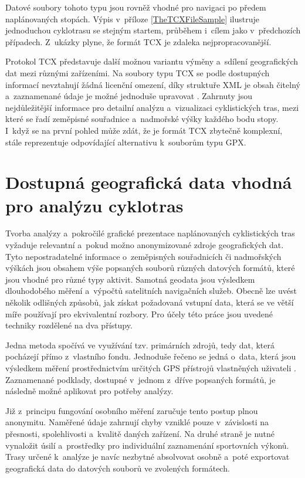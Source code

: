 Datové soubory tohoto typu jsou rovněž vhodné pro navigaci po předem naplánovaných stopách.
Výpis v~příloze \ref{TheTCXFileSample} ilustruje jednoduchou cyklotrasu se stejným startem, průběhem i~cílem jako v~předchozích případech.
Z~ukázky plyne, že formát TCX je zdaleka nejpropracovanější.

Protokol TCX představuje další možnou variantu výměny a~sdílení geografických dat mezi různými zařízeními.
Na soubory typu TCX se podle dostupných informací nevztahují žádná licenční omezení, díky struktuře XML je obsah čitelný a~zaznamenané údaje je možné jednoduše upravovat \cite{AnssensCharles2021}.
Zahrnuty jsou nejdůležitější informace pro detailní analýzu a~vizualizaci cyklistických tras, mezi které se řadí zeměpisné souřadnice a~nadmořské výšky každého bodu stopy.
I~když se na první pohled může zdát, že je formát TCX zbytečně komplexní, stále reprezentuje odpovídající alternativu k~souborům typu GPX.

\section{Dostupná geografická data vhodná pro analýzu cyklotras}
\label{available-geographic-data-suitable-for-cycle-routes-analysis}

Tvorba analýzy a~pokročilé grafické prezentace naplánovaných cyklistických tras vyžaduje relevantní a~pokud možno anonymizované zdroje geografických dat.
Tyto nepostradatelné informace o~zeměpisných souřadnicích či nadmořských výškách jsou obsahem výše popsaných souborů různých datových formátů, které jsou vhodné pro různé typy aktivit.
Samotná geodata jsou výsledkem dlouhodobého měření a~výpočtů satelitních navigačních služeb.
Obecně lze uvést několik odlišných způsobů, jak získat požadovaná vstupní data, která se ve větší míře používají pro ekvivalentní rozbory.
Pro účely této práce jsou uvedené techniky rozdělené na dva přístupy.

Jedna metoda spočívá ve využívání tzv. primárních zdrojů, tedy dat, která pocházejí přímo z~vlastního fondu.
Jednoduše řečeno se jedná o~data, která jsou výsledkem měření prostřednictvím určitých GPS přístrojů vlastněných uživateli \cite{KlufovaRenata2016}.
Zaznamenané podklady, dostupné v~jednom z~dříve popsaných formátů, je následně možné aplikovat pro potřeby analýzy.

Již z~principu fungování osobního měření zaručuje tento postup plnou anonymitu.
Naměřené údaje zahrnují chyby vzniklé pouze v~závislosti na přesnosti, spolehlivosti a~kvalitě daných zařízení.
Na druhé straně je nutné vynaložit úsilí a~prostředky pro individuální zaznamenání sportovních výkonů.
Trasy určené k~analýze je navíc nezbytné absolvovat osobně a~poté exportovat geografická data do datových souborů ve zvolených formátech.

